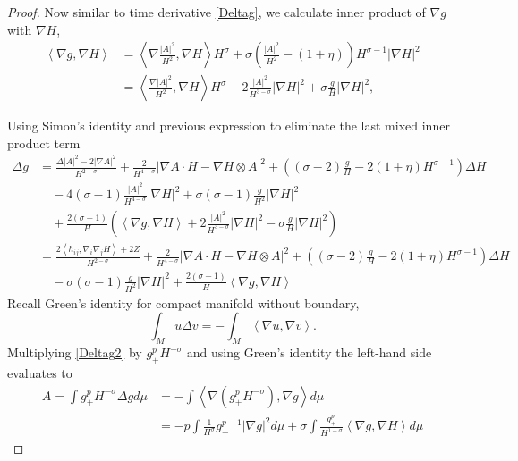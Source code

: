 \begin{proof}
    Now similar to time derivative \cref{Deltag}, we calculate inner product of $ \nabla g $ with $ \nabla H $, \begin{align*}
        \left< \nabla g, \nabla H \right> & = \left< \nabla\frac{ |A|^{2}}{H^{2}}, \nabla H \right>H^{\sigma} + \sigma\left( \frac{|A|^{2}}{H^{2}} - (1+ \eta) \right) H^{\sigma-1}| \nabla H|^{2} \\
        & = \left< \frac{\nabla |A|^{2}}{H^{2}}, \nabla H \right>H^{\sigma} -2 \frac{|A|^{2}}{H^{3-\sigma}}|\nabla H|^{2}+ \sigma \frac{g}{H}| \nabla H|^{2},
    \end{align*}

    Using Simon's identity \cite{Simon} and previous expression to  eliminate the last mixed inner product term 
    \begin{align}
        \Delta g & = \frac{\Delta |A|^{2}- 2|\nabla A|^{2}}{H^{2-\sigma}} + \frac{2}{H^{4-\sigma}}| \nabla A \cdot H - \nabla H \otimes A|^{2} + \left( (\sigma-2)\frac{g}{H} - 2(1+\eta)H^{\sigma-1} \right)\Delta H \nonumber \\
        & \quad - 4(\sigma -1) \frac{|A|^{2}}{H^{4-\sigma}} |\nabla H|^{2} + \sigma(\sigma -1)\frac{g}{H^{2}}|\nabla H|^{2} \nonumber \\
        & \quad + \frac{2(\sigma -1)}{H}\left( \left< \nabla g, \nabla H \right> +2 \frac{|A|^{2}}{H^{3-\sigma}}|\nabla H|^{2} - \sigma \frac{g}{H}|\nabla H|^{2} \right) \nonumber \\
        & = \frac{2\left< h_{ij}, \nabla_{i}\nabla_{j}H \right>+2Z}{H^{2-\sigma}} + \frac{2}{H^{4-\sigma}}| \nabla A \cdot H - \nabla H \otimes A|^{2} + \left( (\sigma-2)\frac{g}{H} - 2(1+\eta)H^{\sigma-1} \right)\Delta H \nonumber \\
        & \quad - \sigma(\sigma-1) \frac{g}{H^{2}}|\nabla H|^{2} + \frac{2(\sigma -1)}{H}\left< \nabla g, \nabla H \label{Deltag2}\right>
    \end{align}
    Recall Green's identity for compact manifold without boundary, 
    \[ \int_{M} u \Delta v = -\int_{M} \left< \nabla u, \nabla v \right> .\]
    Multiplying \cref{Deltag2} by $ g_{+}^{p}H^{-\sigma} $ and using Green's identity the left-hand side evaluates to \begin{align}
      A =  \int g_{+}^{p}H^{-\sigma}\Delta g  d \mu & =- \int \left< \nabla(g_{+}^{p}H^{-\sigma}), \nabla g \right> d \mu \nonumber\\
       & =  -p \int \frac{1}{H^{\sigma}}g_{+}^{p-1}|\nabla g|^{2}d \mu+ \sigma \int \frac{g_{+}^{p}}{H^{1+\sigma}}\left< \nabla g,  \nabla H \right>d \mu \label{ddd}

\end{align}
\end{proof}
